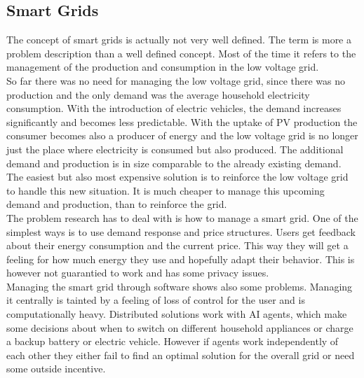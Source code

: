 \documentclass[a4paper]{article}
\begin{document}
\subsection{Smart Grids}
The concept of smart grids is actually not very well defined. The term is more a problem description than a well defined concept. Most of the time it refers to the management of the production and consumption in the low voltage grid. \\ 
So far there was no need for managing the low voltage grid, since there was no production and the only demand was the average household electricity consumption. With the introduction of electric vehicles, the demand increases significantly and becomes less predictable. With the uptake of PV production the consumer becomes also a producer of energy and the low voltage grid is no longer just the place where electricity is consumed but also produced. The additional demand and production is in size comparable to the already existing demand. The easiest but also most expensive solution is to reinforce the low voltage grid to handle this new situation. It is much cheaper to manage this upcoming demand and production, than to reinforce the 
grid.\\
The problem research has to deal with is how to manage a smart grid. One of the simplest ways is to use demand response and price structures. Users get feedback about their energy consumption and the current price. This way they will get a feeling for how much energy they use and hopefully adapt their behavior. This is however not guarantied to work and has some privacy issues. \\

Managing the smart grid through software shows also some problems. Managing it centrally is tainted by a feeling of loss of control for the user and is computationally heavy. Distributed solutions work with AI agents, which make some decisions about when to switch on different household appliances or charge a backup battery or electric vehicle. However if agents work independently of each other they either fail to find an optimal solution for the overall grid or need some outside incentive.       
\end{document}
